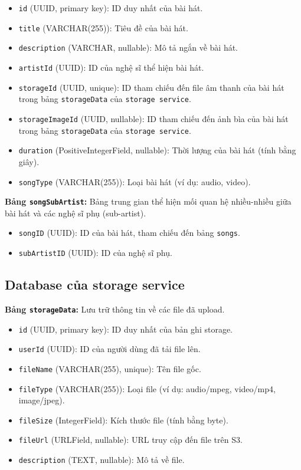 \begin{itemize}
    \item \texttt{id} (UUID, primary key): ID duy nhất của bài hát.
    \item \texttt{title} (VARCHAR(255)): Tiêu đề của bài hát.
    \item \texttt{description} (VARCHAR, nullable): Mô tả ngắn về bài hát.
    \item \texttt{artistId} (UUID): ID của nghệ sĩ thể hiện bài hát.
    \item \texttt{storageId} (UUID, unique): ID tham chiếu đến file âm thanh của bài hát trong bảng \texttt{storageData} của \texttt{storage service}.
    \item \texttt{storageImageId} (UUID, nullable): ID tham chiếu đến ảnh bìa của bài hát trong bảng \texttt{storageData} của \texttt{storage service}.
    \item \texttt{duration} (PositiveIntegerField, nullable): Thời lượng của bài hát (tính bằng giây).
    \item \texttt{songType} (VARCHAR(255)): Loại bài hát (ví dụ: audio, video).
\end{itemize}
\textbf{Bảng \texttt{songSubArtist}:} Bảng trung gian thể hiện mối quan hệ nhiều-nhiều giữa bài hát và các nghệ sĩ phụ (sub-artist).
\begin{itemize}
    \item \texttt{songID} (UUID): ID của bài hát, tham chiếu đến bảng \texttt{songs}.
    \item \texttt{subArtistID} (UUID): ID của nghệ sĩ phụ.
\end{itemize}

\subsection{Database của storage service}
\label{subsec:db_storage_service}

\textbf{Bảng \texttt{storageData}:} Lưu trữ thông tin về các file đã upload.
\begin{itemize}
    \item \texttt{id} (UUID, primary key): ID duy nhất của bản ghi storage.
    \item \texttt{userId} (UUID): ID của người dùng đã tải file lên.
    \item \texttt{fileName} (VARCHAR(255), unique): Tên file gốc.
    \item \texttt{fileType} (VARCHAR(255)): Loại file (ví dụ: audio/mpeg, video/mp4, image/jpeg).
    \item \texttt{fileSize} (IntegerField): Kích thước file (tính bằng byte).
    \item \texttt{fileUrl} (URLField, nullable): URL truy cập đến file trên S3.
    \item \texttt{description} (TEXT, nullable): Mô tả về file.
\end{itemize}

